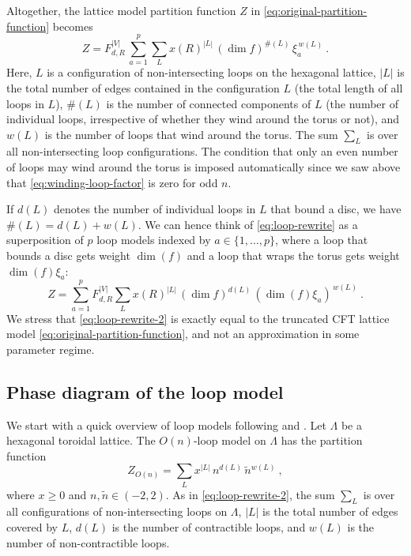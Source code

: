 \documentclass[11pt,a4paper]{article}
\numberwithin{equation}{section}
\begin{document}
\medskip

Altogether, the lattice model partition function $Z$ in \eqref{eq:original-partition-function} becomes
\begin{equation}\label{eq:loop-rewrite}    
Z = F_{d,R}^{|V|} \, \sum_{a=1}^p \sum_{L} x(R)^{|L|} \, (\dim f)^{\#(L)} \, \xi_a^{\,w(L)}
 ~.
\end{equation}
Here, $L$ is a configuration of non-intersecting loops on the hexagonal lattice, $|L|$ is the total number of edges contained in the configuration $L$ (the total length of all loops in $L$), $\#(L)$ is the number of connected components of $L$ (the number of individual loops, irrespective of whether they wind around the torus or not), and $w(L)$ is the number of loops that wind around the torus. 
The sum $\sum_L$ is over all non-intersecting loop configurations. The condition that only an even number of loops may wind around the torus is imposed automatically since we saw above that \eqref{eq:winding-loop-factor} is zero for odd $n$.

If $d(L)$ denotes the number of individual loops in $L$ that bound a disc, we have $\#(L) = d(L) + w(L)$. We can hence think of \eqref{eq:loop-rewrite} as a superposition of $p$ loop models indexed by $a \in \{1,\dots,p\}$, where a loop that bounds a disc gets weight $\dim(f)$ and a loop that wraps the torus gets weight $\dim(f) \xi_a$:
\begin{equation}\label{eq:loop-rewrite-2}    
Z = \sum_{a=1}^p F_{d,R}^{|V|} \sum_{L} x(R)^{|L|} \, (\dim f)^{d(L)} \, (\dim(f) \xi_a)^{\,w(L)}
 ~.
\end{equation}
We stress that \eqref{eq:loop-rewrite-2} is exactly equal to the truncated CFT lattice model \eqref{eq:original-partition-function}, and not an approximation in some parameter regime.

\subsection{Phase diagram of the loop model}

We start with a quick overview of loop models following \cite[Sec.\,2.1]{Dubail:2009mb} and \cite[Sec.\,2]{Estienne:2015sua}.
Let $\Lambda$ be a hexagonal toroidal lattice. The $O(n)$-loop model on $\Lambda$ has the partition function
\begin{equation}
Z_{O(n)} = \sum_{L} x^{|L|} \, n^{d(L)} \, \widetilde n{}^{w(L)} ~,
\end{equation}
where $x \ge 0$ and $n,\widetilde n \in (-2,2)$. As in \eqref{eq:loop-rewrite-2}, the sum $\sum_L$ is over all configurations of non-intersecting loops on $\Lambda$, $|L|$ is the total number of edges covered by $L$, $d(L)$ is the number of contractible loops, and $w(L)$ is the number of non-contractible loops. 
\end{document}
